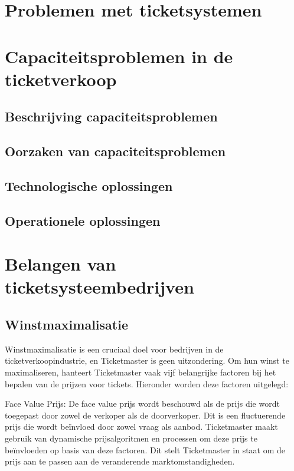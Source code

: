 \documentclass[a4paper,10pt]{article}
\begin{document}
\tableofcontents
\newpage

\section{Problemen met ticketsystemen}
\newpage

\section{Capaciteitsproblemen in de ticketverkoop}
\subsection{Beschrijving capaciteitsproblemen}
\subsection{Oorzaken van capaciteitsproblemen}
\subsection{Technologische oplossingen}
\subsection{Operationele oplossingen}

\newpage
\section{Belangen van ticketsysteembedrijven}

\subsection{Winstmaximalisatie}
Winstmaximalisatie is een cruciaal doel voor bedrijven in de ticketverkoopindustrie, en Ticketmaster is geen uitzondering. Om hun winst te maximaliseren, hanteert Ticketmaster vaak vijf belangrijke factoren bij het bepalen van de prijzen voor tickets. Hieronder worden deze factoren uitgelegd:

\vspace{5 mm}

Face Value Prijs: De face value prijs wordt beschouwd als de prijs die wordt toegepast door zowel de verkoper als de doorverkoper. Dit is een fluctuerende prijs die wordt beïnvloed door zowel vraag als aanbod. Ticketmaster maakt gebruik van dynamische prijsalgoritmen en processen om deze prijs te beïnvloeden op basis van deze factoren. Dit stelt Ticketmaster in staat om de prijs aan te passen aan de veranderende marktomstandigheden.
\end{document}
